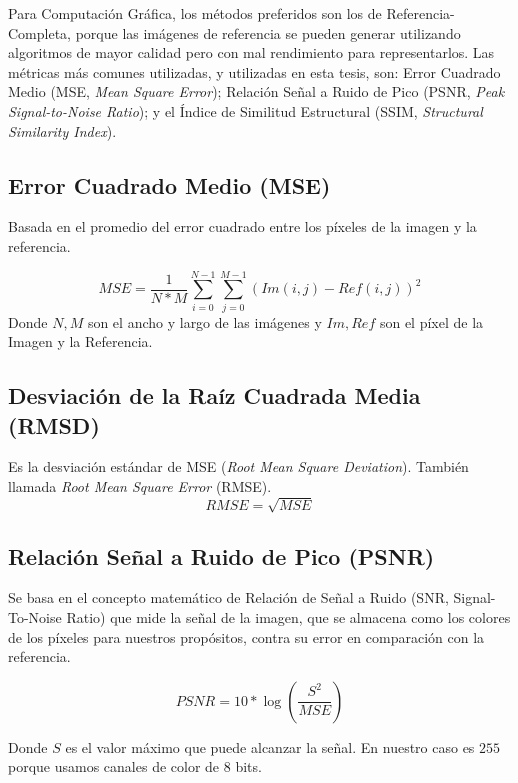 \documentclass[pregrado]{tesis-usb} %
\begin{document}
Para Computación Gráfica, los métodos preferidos son los de Referencia-Completa, porque las imágenes de referencia se pueden generar utilizando algoritmos de mayor calidad pero con mal rendimiento para representarlos. Las métricas más comunes utilizadas, y utilizadas en esta tesis, son: Error Cuadrado Medio (MSE, \textit{Mean Square Error}); Relación Señal a Ruido de Pico (PSNR, \textit{Peak Signal-to-Noise Ratio}); y el Índice de Similitud Estructural  (SSIM, \textit{Structural Similarity Index}).

\subsection{Error Cuadrado Medio (MSE)}
Basada en el promedio del error cuadrado entre los píxeles de la imagen y la referencia. 

\begin{equation}\label{eq:mse}
	MSE=\frac{1}{N*M}\sum\limits_{i=0}^{N-1}\sum\limits_{j=0}^{M-1}(Im(i,j)-Ref(i,j))^2
\end{equation}
Donde $N, M$ son el ancho y largo de las imágenes y $Im, Ref$ son el píxel de la Imagen y la Referencia.

\subsection{Desviación de la Raíz Cuadrada Media  (RMSD)}
Es la desviación estándar de MSE (\textit{Root Mean Square Deviation}). También llamada \textit{Root Mean Square Error} (RMSE).
\begin{equation}\label{eq:rmse}
RMSE=\sqrt{MSE}
\end{equation}

\subsection{Relación Señal a Ruido de Pico (PSNR)}
Se basa en el concepto matemático de Relación de Señal a Ruido (SNR, Signal-To-Noise Ratio) que mide la señal de la imagen, que se almacena como los colores de los píxeles para nuestros propósitos, contra su error en comparación con la referencia. \cite{Yusra2012}

\begin{equation}\label{eq:psnr}
PSNR=10*\log\left(\frac{S^2}{MSE}\right)
\end{equation}

Donde $S$ es el valor máximo que puede alcanzar la señal. En nuestro caso es $255$ porque usamos canales de color de 8 bits.
\end{document}
